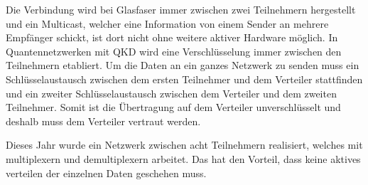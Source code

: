 Die Verbindung wird bei Glasfaser immer zwischen zwei Teilnehmern hergestellt und ein Multicast, welcher eine Information von einem Sender an mehrere Empfänger schickt, ist dort nicht ohne weitere aktiver Hardware möglich.
In Quantennetzwerken mit \ac{QKD} wird eine Verschlüsselung immer zwischen den Teilnehmern etabliert.
Um die Daten an ein ganzes Netzwerk zu senden muss ein Schlüsselaustausch zwischen dem ersten Teilnehmer und dem Verteiler stattfinden und ein zweiter Schlüsselaustausch zwischen dem Verteiler und dem zweiten Teilnehmer.
Somit ist die Übertragung auf dem Verteiler unverschlüsselt und deshalb muss dem Verteiler vertraut werden\cite{Qiu2018}.

Dieses Jahr wurde ein Netzwerk zwischen acht Teilnehmern realisiert, welches mit multiplexern und demultiplexern arbeitet.
Das hat den Vorteil, dass keine aktives verteilen der einzelnen Daten geschehen muss\cite{Siddarth2020}.


